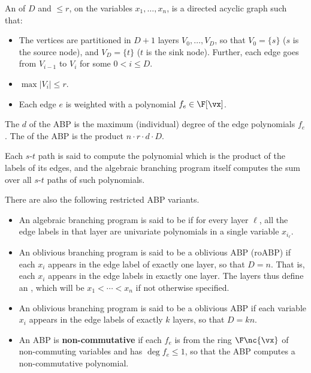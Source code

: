 \documentclass{toc}
\begin{document}
\begin{definition}\label{def:roABP}
        An  of  $D$ and  $\le r$, on the variables $x_1,\ldots,x_n$, is a directed acyclic graph such that:
        \begin{itemize}
                \item The vertices are partitioned in $D+1$ layers $V_0,\ldots,V_D$, so that $V_0=\{s\}$ ($s$ is the source node), and $V_D=\{t\}$ ($t$ is the sink node). Further, each edge goes from $V_{i-1}$ to $V_{i}$ for some $0< i\le D$.
                \item $\max|V_i|\le r$.
                \item Each edge $e$ is weighted with a polynomial $f_e\in\F[\vx]$.
        \end{itemize}
        The  $d$ of the ABP is the maximum (individual) degree of the edge polynomials $f_e$. The  of the ABP is the product $n\cdot r\cdot d\cdot D$.

        Each $s$-$t$ path is said to compute the polynomial which is the product of the labels of its edges, and the algebraic branching program itself computes the sum over all $s$-$t$ paths of such polynomials.

        There are also the following restricted ABP variants.
        \begin{itemize}
                \item An algebraic branching program is said to be  if for every layer $\ell$, all the edge labels in that layer are univariate polynomials in a single variable $x_{i_\ell}$.
                \item An oblivious branching program is said to be a  oblivious ABP (roABP) if each $x_i$ appears in the edge label of exactly one layer, so that $D=n$. That is, each $x_i$ appears in the edge labels in  exactly one layer. The layers thus define
an ,
which will be $x_1<\cdots<x_n$ if not otherwise specified.
                \item An oblivious branching program is said to be a  oblivious ABP if each variable $x_i$ appears in the edge labels of exactly $k$ layers, so that $D=kn$.
                \item An ABP is \textbf{non-commutative} if each $f_e$ is from the ring $\F\nc{\vx}$ of non-commuting variables and has $\deg f_e\le 1$, so that the ABP computes a non-commutative polynomial.
                        \qedhere
        \end{itemize}
\end{definition}
\end{document}

